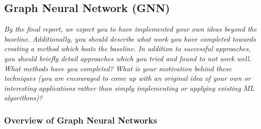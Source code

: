 \documentclass{article}
\begin{document}




\subsection{Graph Neural Network (GNN)}

\textit{By the final report, we expect you to have implemented your own ideas beyond the baseline. Additionally, you should describe what work you have completed towards creating a method which beats the
baseline. In addition to successful approaches, you should briefly detail approaches which you tried and found to not work well. What methods have you completed? What is your motivation behind these techniques (you are encouraged to come up with an original idea of your own or interesting applications rather than simply implementing or applying existing ML algorithms)?}

\subsubsection{Overview of Graph Neural Networks}
\end{document}
